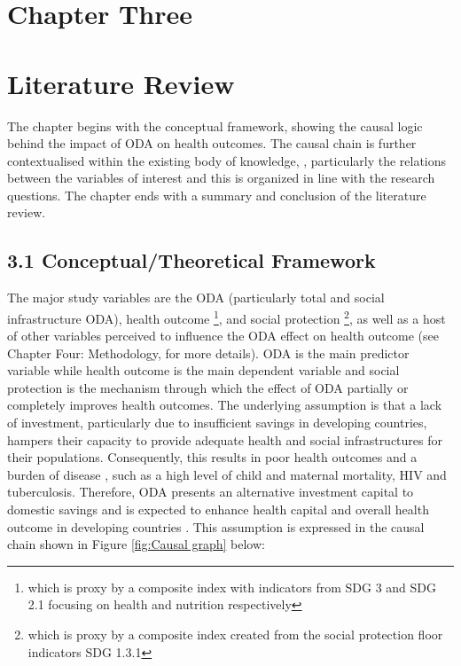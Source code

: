 \section*{\centering Chapter Three}
\section*{\centering Literature Review}
The chapter begins with the conceptual framework, showing the causal logic behind the impact of ODA on health outcomes. The causal chain is further contextualised within the existing body of knowledge, , particularly the relations between the variables of interest and this is organized in line with the research questions. The chapter ends with a summary and conclusion of the literature review. 

\subsection*{3.1 Conceptual/Theoretical Framework}
The major study variables are the ODA (particularly total and social infrastructure ODA), health outcome \footnote{which is proxy by a composite index with indicators from SDG 3 and SDG 2.1 focusing on health and nutrition respectively}, and social protection \footnote{which is proxy by a composite index created from the social protection floor indicators SDG 1.3.1}, as well as a host of other variables perceived to influence the ODA effect on health outcome (see Chapter Four: Methodology, for more details). ODA is the main predictor variable while health outcome is the main dependent variable and social protection is the mechanism through which the effect of ODA partially or completely improves health outcomes. 
The underlying assumption is that a lack of investment, particularly due to insufficient savings in developing countries, hampers their capacity to provide adequate health and social infrastructures for their populations. Consequently, this results in poor health outcomes and a burden of disease \parencite[]{gama_health_2015}, such as a high level of child and maternal mortality, HIV and tuberculosis. Therefore, ODA presents an alternative investment capital to domestic savings and is expected to enhance health capital and overall health outcome in developing countries \parencite{sachs_case_2014, temple_aid_2010}. This assumption is expressed in the causal chain shown in Figure \ref{fig:Causal graph} below:

